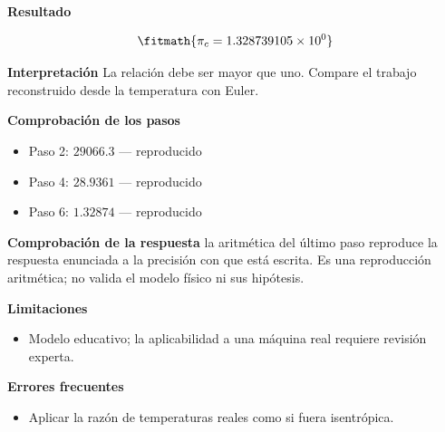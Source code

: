 \documentclass[10pt,openany]{book}
\begin{document}
\begin{tcolorbox}[title={Problema resuelto 1}, studiumworked, breakable]
\noindent\textbf{Resultado}

\[
\fitmath{\pi_c=1.328739105\times10^{0}}
\]

\noindent\textbf{Interpretación}
La relación debe ser mayor que uno. Compare el trabajo reconstruido desde la temperatura con Euler.

\noindent\textbf{Comprobación de los pasos}
\begin{itemize}
\item Paso 2: $29066.3$ — reproducido
\item Paso 4: $28.9361$ — reproducido
\item Paso 6: $1.32874$ — reproducido
\end{itemize}

\noindent\textbf{Comprobación de la respuesta} la aritmética del último paso reproduce la respuesta enunciada a la precisión con que está escrita. Es una reproducción aritmética; no valida el modelo físico ni sus hipótesis.

\noindent\textbf{Limitaciones}
\begin{itemize}
\item Modelo educativo; la aplicabilidad a una máquina real requiere revisión experta.
\end{itemize}

\noindent\textbf{Errores frecuentes}
\begin{itemize}
\item Aplicar la razón de temperaturas reales como si fuera isentrópica.
\end{itemize}
\end{tcolorbox}
\end{document}
